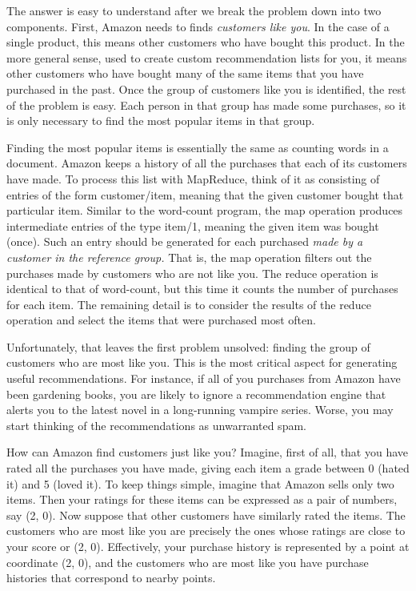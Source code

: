 The answer is easy to understand after we break the problem down into
two components.  First, Amazon needs to finds \textit{customers like
you}.  In the case of a single product, this means other customers who
have bought this product.  In the more general sense, used to create custom
recommendation lists for you, it means other customers who have bought many
of the same items that you have purchased in the past.  Once the group of
customers like you is identified, the rest of the problem is easy.  Each
person in that group has made some purchases, so it is only necessary to
find the most popular items in that group.

Finding the most popular items is essentially the same as counting words
in a document.
Amazon keeps a history of all the purchases that each of its
customers have made.  To process this list with MapReduce, think of it as
consisting of entries of the form customer/item, meaning that the given
customer bought that particular item.  Similar to the word-count program,
the map operation produces intermediate entries of the type item/1, meaning
the given item was bought (once).  Such an entry should be generated for
each purchased \textit{made by a customer in the reference group.}  That is,
the map operation filters out the purchases made by customers who are
not like you.  The reduce operation is identical to that of word-count, 
but this time it counts the number of purchases for each item.  
The remaining detail is to consider the results of the reduce operation 
and select the items that were purchased most often.

Unfortunately, that leaves the first problem unsolved: finding the group of
customers who are most like you.  This is the most critical aspect for
generating useful recommendations.  For instance, if all of you purchases
from Amazon have been gardening books, you are likely to ignore a
recommendation engine that alerts you to the latest novel in a long-running 
vampire series.  Worse, you may start thinking of the recommendations
as unwarranted spam.

How can Amazon find customers just like you?  Imagine, first of all, that
you have rated all the purchases you have made, giving each item a grade between
0 (hated it) and 5 (loved it).  To keep things simple, imagine that Amazon
sells only two items.  Then your ratings for these items can be expressed as
a pair of numbers, say (2, 0).  Now suppose that other customers have similarly
rated the items.  The customers who are most like you are precisely the ones
whose ratings are close to your score or (2, 0).  Effectively, your purchase
history is represented by a point at coordinate (2, 0), and the customers who
are most like you have purchase histories that correspond to nearby points.

